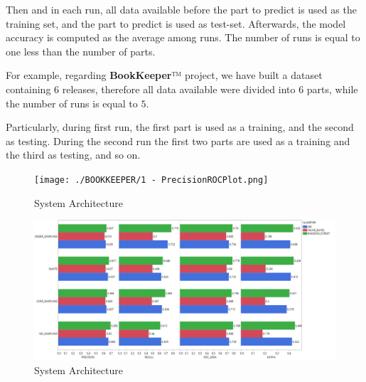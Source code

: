 \documentclass[sigconf]{acmart}
\begin{document}
Then and in each run, all data available before the part to predict is used as the training set, and the part to predict is used as test-set. Afterwards, the model accuracy is computed as the average among runs. The number of runs is equal to one less than the number of parts.

For example, regarding \textbf{BookKeeper}™ project, we have built a dataset containing $6$ releases, therefore all data available were divided into $6$ parts, while the number of runs is equal to $5$.

Particularly, during first run, the first part is used as a training, and the second as testing. During the second run the first two parts are used as a training and the third as testing, and so on. 
 

\begin{figure}[h]
  \centering
  \texttt{[image: ./BOOKKEEPER/1 - PrecisionROCPlot.png]}
  \caption{System Architecture}
  \label{fig:BOOKKEEPER:SamplingNoFeatureSelection}
\end{figure}


 



\begin{figure}[h]
  \centering
  \includegraphics[width=\linewidth]{1 - BOOKKEEPER - SamplingNoFeatureSelection}
  \caption{System Architecture}
  \label{fig:BOOKKEEPER:SamplingNoFeatureSelection}
\end{figure}









\end{document}
